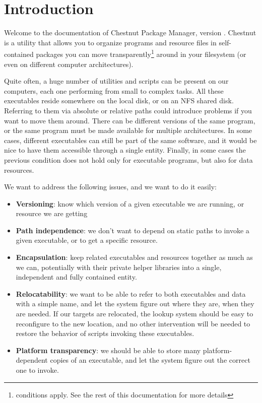 \section{Introduction}

Welcome to the documentation of Chestnut Package Manager, version \version{}.
Chestnut is a utility that allows you to organize programs and resource files
in self-contained packages you can move transparently\footnote{conditions
apply. See the rest of this documentation for more details} around in your
filesystem (or even on different computer architectures).

Quite often, a huge number of utilities and scripts can be present on our
computers, each one performing from small to complex tasks.  All these
executables reside somewhere on the local disk, or on an NFS shared disk.
Referring to them via absolute or relative paths could introduce problems if
you want to move them around. There can be different versions of the same
program, or the same program must be made available for multiple architectures.
In some cases, different executables can still be part of the same software,
and it would be nice to have them accessible through a single entity. Finally,
in some cases the previous condition does not hold only for executable programs, but also for data resources.

We want to address the following issues, and we want to do it easily:

\begin{itemize}
\item \textbf{Versioning}: know which version of a given executable we are running, or resource
we are getting
\item \textbf{Path independence}: we don't want to depend on static paths to
invoke a given executable, or to get a specific resource.
\item \textbf{Encapsulation}: keep related executables and resources
together as much as we can, potentially with their private helper libraries
into a single, independent and fully contained entity.
\item \textbf{Relocatability}: we want to be able to refer to both executables
and data with a simple name, and let the system figure out where they are, when
they are needed. If our targets are relocated, the lookup system should be easy
to reconfigure to the new location, and no other intervention will be needed to
restore the behavior of scripts invoking these executables.
\item \textbf{Platform transparency}: we should be able to store many platform-dependent
copies of an executable, and let the system figure out the correct one to invoke.
\end{itemize}

